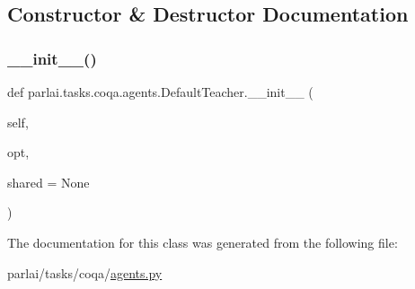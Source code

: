 \subsection{Constructor \& Destructor Documentation}
\mbox{\label{classparlai_1_1tasks_1_1coqa_1_1agents_1_1DefaultTeacher_a62b634fe9152617c94604f39ff7851a1}} 
\subsubsection{\texorpdfstring{\+\_\+\+\_\+init\+\_\+\+\_\+()}{\_\_init\_\_()}}
{\footnotesize\ttfamily def parlai.\+tasks.\+coqa.\+agents.\+Default\+Teacher.\+\_\+\+\_\+init\+\_\+\+\_\+ (\begin{DoxyParamCaption}\item[{}]{self,  }\item[{}]{opt,  }\item[{}]{shared = {\ttfamily None} }\end{DoxyParamCaption})}



The documentation for this class was generated from the following file\+:\begin{DoxyCompactItemize}
\item 
parlai/tasks/coqa/\hyperlink{parlai_2tasks_2coqa_2agents_8py}{agents.\+py}\end{DoxyCompactItemize}
